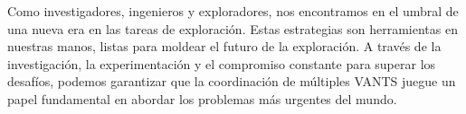 \documentclass[sigconf]{acmart}
\begin{document}
Como investigadores, ingenieros y exploradores, nos encontramos en el umbral de una nueva era en las tareas de exploración. Estas estrategias son herramientas en nuestras manos, listas para moldear el futuro de la exploración. A través de la investigación, la experimentación y el compromiso constante para superar los desafíos, podemos garantizar que la coordinación de múltiples VANTS juegue un papel fundamental en abordar los problemas más urgentes del mundo.







\end{document}
